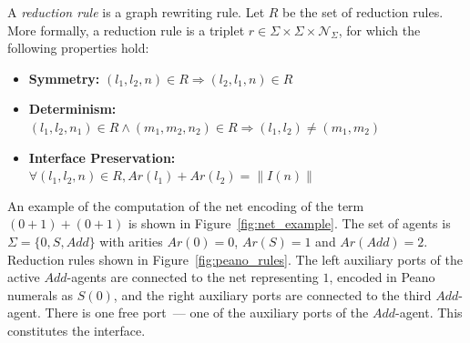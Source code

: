 \begin{definition}
A \textit{reduction rule} is a graph rewriting rule. Let $R$ be the set of reduction rules. More formally, a reduction rule is a triplet $r \in \Sigma \times \Sigma \times \mathcal{N}_\Sigma$, for which the following properties hold:
\begin{itemize}
    \item \textbf{Symmetry:} $(l_1, l_2, n) \in R \Rightarrow (l_2, l_1, n) \in R$
    \item \textbf{Determinism:} $(l_1, l_2, n_1) \in R \land (m_1, m_2, n_2) \in R \Rightarrow (l_1, l_2) \neq (m_1, m_2)$
    \item \textbf{Interface Preservation:} $\forall (l_1, l_2, n) \in R, Ar(l_1) + Ar(l_2) = \|I(n)\|$
\end{itemize}
\end{definition}

An example of the computation of the net encoding of the term $(0 + 1) + (0 + 1)$ is shown in Figure~\ref{fig:net_example}.
The set of agents is $\Sigma=\{0, S, Add\}$ with arities $Ar(0)=0$, $Ar(S)=1$ and $Ar(Add)=2$.
Reduction rules shown in Figure~\ref{fig:peano_rules}.
The left auxiliary ports of the active $Add$-agents are connected to the net representing $1$, encoded in Peano numerals as $S(0)$, and the right auxiliary ports are connected to the third $Add$-agent.
There is one free port~--- one of the auxiliary ports of the $Add$-agent.
This constitutes the interface.


